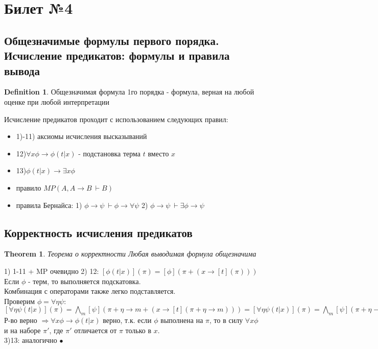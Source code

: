 \documentclass[a4paper]{article}
\theoremstyle{plain}
\newtheorem{theorem}{Theorem}
\theoremstyle{remark}
\theoremstyle{definition}
\newtheorem{definition}{Definition}
\renewenvironment{proof}{{\bfseries Proof}}{$\bullet$}
\begin{document}
\section{Билет №4}
\subsection{Общезначимые формулы первого порядка. Исчисление предикатов: формулы и правила вывода}
\begin{definition}
	Общезначимая формула 1го порядка - формула, верная на любой оценке при любой интерпретации
\end{definition}
Исчисление предикатов проходит с использованием следующих правил:
\begin{itemize}
	\item  1)-11) аксиомы исчисления высказываний
	\item  12)$\forall x \phi\rightarrow\phi(t|x)$ - подстановка терма $t$ вместо $x$
	\item 13)$\phi(t|x) \rightarrow \exists x \phi$
	\item правило $MP (A, A\rightarrow B\ \vdash B)$
	\item правила Бернайса: 1) $\phi\rightarrow\psi \ \vdash \phi\rightarrow\forall\psi$ 2) $\phi\rightarrow\psi \ \vdash \exists\phi\rightarrow\psi$
\end{itemize}
\subsection{Корректность исчисления предикатов}
\begin{theorem}{Теорема о корректности}
Любая выводимая формула общезначима	
\end{theorem}
\begin{proof}
1) 1-11 + MP очевидно
2) 12: $[\phi(t|x)](\pi)=[\phi](\pi+(x\rightarrow [t](\pi)))$\\
Если $\phi$ - терм, то выполняется подскатовка.\\
Комбинация с операторами также легко подставляется.\\
Проверим $\phi=\forall\eta\psi$:\\
$[\forall\eta\psi(t|x)](\pi)=\bigwedge_m[\psi](\pi+\eta\rightarrow m + (x\rightarrow[t](\pi+\eta\rightarrow m))) = 
[\forall\eta\psi(t|x)](\pi)=\bigwedge_m[\psi](\pi+\eta\rightarrow m + (x\rightarrow[t](\pi))) = [\forall\eta\psi(t|x)](\pi + x\rightarrow[t](\pi))$\\
Р-во верно $\Rightarrow \forall x\phi\rightarrow\phi(t|x)$ верно, т.к. если $\phi$ выполнена на $\pi$, то в силу $\forall x\phi$ и на наборе $\pi'$, где $\pi'$ отличается от $\pi$ только в $x$.\\
3)13: аналогично
\end{proof}
\end{document}
